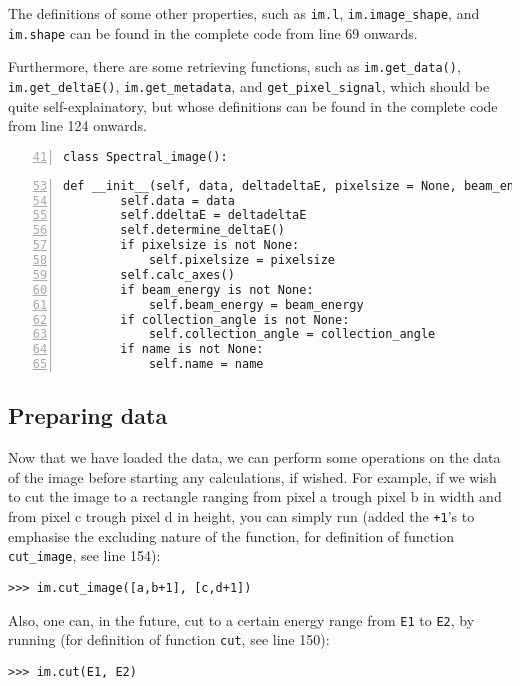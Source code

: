 \documentclass{article}
\begin{document}
The definitions of some other properties, such as \verb|im.l|, \verb|im.image_shape|, and \verb|im.shape| can be found in the complete code from line 69 onwards.

Furthermore, there are some retrieving functions, such as \verb|im.get_data()|, \verb|im.get_deltaE()|, \verb|im.get_metadata|, and \verb|get_pixel_signal|, which should be quite self-explainatory, but whose definitions can be found in the complete code from line 124 onwards.

%

\begin{lstlisting}[numbers=left, firstnumber=41]
class Spectral_image():
\end{lstlisting}
%
\begin{lstlisting}[numbers=left, firstnumber=53]
    def __init__(self, data, deltadeltaE, pixelsize = None, beam_energy = None, collection_angle = None, name = None):
        self.data = data
        self.ddeltaE = deltadeltaE
        self.determine_deltaE()
        if pixelsize is not None:
            self.pixelsize = pixelsize
        self.calc_axes()
        if beam_energy is not None:
            self.beam_energy = beam_energy
        if collection_angle is not None:
            self.collection_angle = collection_angle
        if name is not None:
            self.name = name
\end{lstlisting}

\subsection{Preparing data}
Now that we have loaded the data, we can perform some operations on the data of the image before starting any calculations, if wished. For example, if we wish to cut the image to a rectangle ranging from pixel a trough pixel b in width and from pixel c trough pixel d in height, you can simply run (added the \verb|+1|'s to emphasise the excluding nature of the function, for definition of function \verb|cut_image|, see line 154):

\begin{lstlisting}
>>> im.cut_image([a,b+1], [c,d+1])
\end{lstlisting}

Also, one can, in the future, cut to a certain energy range from \verb|E1| to \verb|E2|, by running (for definition of function \verb|cut|, see line 150):

\begin{lstlisting}
>>> im.cut(E1, E2)
\end{lstlisting}
\end{document}
